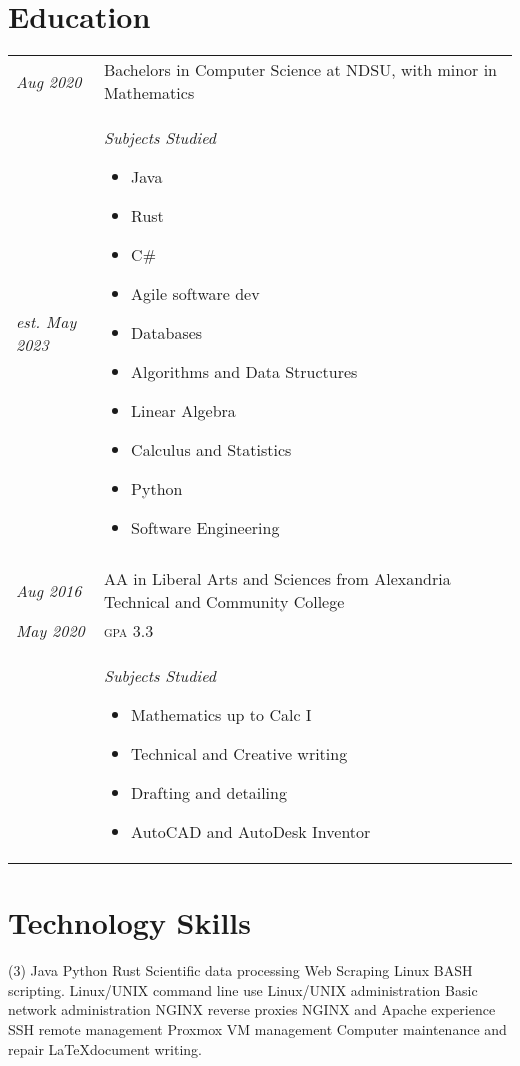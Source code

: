 \documentclass[letterpaper,10pt]{article}
\begin{document}
\section*{Education}
	\begin{tabular}{R{2cm}|p{14cm}}
	\textsl{Aug 2020} & Bachelors in Computer Science at NDSU, with minor in Mathematics\\
	\textsl{est. May 2023} & \textsl{Subjects Studied}
	\begin{itemize}[noitemsep]
		\item Java
		\item Rust
		\item C\#
		\item Agile software dev
		\item Databases
		\item Algorithms and Data Structures
		\item Linear Algebra
		\item Calculus and Statistics
		\item Python
		\item Software Engineering
	\end{itemize}\\
	\\
	\textsl{Aug 2016} & AA in Liberal Arts and Sciences from Alexandria Technical and Community College\\
	\textsl{May 2020} & \textsc{gpa} 3.3\\
	&\textsl{Subjects Studied}
	\begin{itemize}[noitemsep]
		\item Mathematics up to Calc I
		\item Technical and Creative writing
		\item Drafting and detailing
		\item AutoCAD and AutoDesk Inventor
	\end{itemize}
	\end{tabular}
\newpage
\section*{Technology Skills}
	\begin{tasks}[style=itemize](3)
	\task Java
	\task Python
	\task Rust
	\task Scientific data processing
	\task Web Scraping
	\task Linux BASH scripting.
	\task Linux/UNIX command line use
	\task Linux/UNIX administration
	\task Basic network administration
	\task NGINX reverse proxies
	\task NGINX and Apache experience
	\task SSH remote management
	\task Proxmox VM management
	\task Computer maintenance and repair
	\task \LaTeX document writing.
	\end{tasks}
\end{document}
